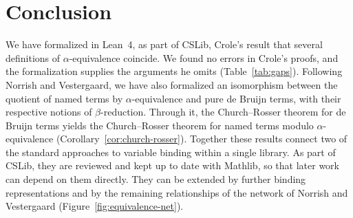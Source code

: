 \section{Conclusion}
\label{sec:conclusion}

We have formalized in Lean~4, as part of CSLib, Crole's result that
several definitions of $\alpha$-equivalence coincide. We found no
errors in Crole's proofs, and the formalization supplies the arguments
he omits (Table~\ref{tab:gaps}). Following Norrish and Vestergaard, we
have also formalized an isomorphism between the quotient of named terms
by $\alpha$-equivalence and pure de Bruijn terms, with their respective
notions of $\beta$-reduction. Through it, the Church--Rosser theorem
for de Bruijn terms yields the Church--Rosser theorem for named terms
modulo $\alpha$-equivalence (Corollary~\ref{cor:church-rosser}).
Together these results connect two of the standard approaches to
variable binding within a single library. As part of CSLib, they are
reviewed and kept up to date with Mathlib, so that later work can
depend on them directly. They can be extended by further binding
representations and by the remaining relationships of the network of
Norrish and Vestergaard (Figure~\ref{fig:equivalence-net}).
